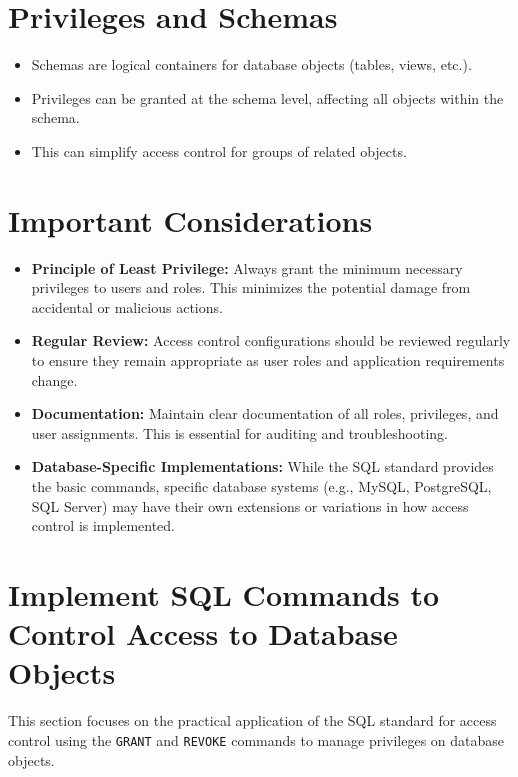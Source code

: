 \documentclass[12pt,a4paper]{article}
\begin{document}
\section{Privileges and Schemas}
\begin{itemize}
    \item Schemas are logical containers for database objects (tables, views, etc.).
    \item Privileges can be granted at the schema level, affecting all objects within the schema.
    \item This can simplify access control for groups of related objects.
\end{itemize}

\section{Important Considerations}
\begin{itemize}
    \item \textbf{Principle of Least Privilege:} Always grant the minimum necessary privileges to users and roles. This minimizes the potential damage from accidental or malicious actions.
    \item \textbf{Regular Review:} Access control configurations should be reviewed regularly to ensure they remain appropriate as user roles and application requirements change.
    \item \textbf{Documentation:} Maintain clear documentation of all roles, privileges, and user assignments. This is essential for auditing and troubleshooting.
    \item \textbf{Database-Specific Implementations:} While the SQL standard provides the basic commands, specific database systems (e.g., MySQL, PostgreSQL, SQL Server) may have their own extensions or variations in how access control is implemented.
\end{itemize}

\vspace{0.5cm}

\section{Implement SQL Commands to Control Access to Database Objects}

This section focuses on the practical application of the SQL standard for access control using the \texttt{GRANT} and \texttt{REVOKE} commands to manage privileges on database objects.
\end{document}
